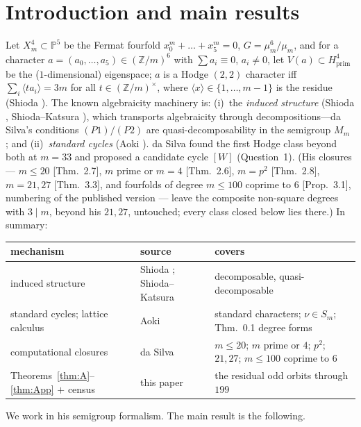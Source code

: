 \documentclass[11pt]{amsart}
\theoremstyle{remark}
\newcommand{\Z}{\mathbb{Z}}
\newcommand{\PP}{\mathbb{P}}
\newcommand{\fr}[1]{\langle #1\rangle}
\newcommand{\V}{V}
\begin{document}
\section{Introduction and main results}\label{sec:intro}
Let $X^4_m\subset\PP^5$ be the Fermat fourfold $x_0^m+\dots+x_5^m=0$, $G=\mu_m^6/\mu_m$, and for a
character $a=(a_0,\dots,a_5)\in(\Z/m)^6$ with $\sum a_i\equiv0$, $a_i\neq0$, let $\V(a)\subset
H^4_{\mathrm{prim}}$ be the ($1$-dimensional) eigenspace; $a$ is a Hodge $(2,2)$ character iff
$\sum_i\fr{ta_i}=3m$ for all $t\in(\Z/m)^\times$, where $\fr{x}\in\{1,\dots,m-1\}$ is the residue
(Shioda \cite{Shioda79}). The known algebraicity machinery is: (i)~the \emph{induced structure}
(Shioda \cite{Shioda79}, Shioda--Katsura \cite{SK}), which transports algebraicity through
decompositions---da Silva's conditions $(P1)/(P2)$ are quasi-decomposability in the semigroup $M_m$
\cite{daSilva}; and (ii)~\emph{standard cycles} (Aoki \cite{Aoki87}). da Silva \cite[Prop.~3.4 (= Prop.~3.6 of the arXiv version)]{daSilva}
found the first Hodge class beyond both at $m=33$ and proposed a candidate cycle $[W]$ (Question~1).
(His closures --- $m\le20$ [Thm.~2.7], $m$ prime or $m=4$ [Thm.~2.6], $m=p^2$ [Thm.~2.8],
$m=21,27$ [Thm.~3.3], and fourfolds of degree $m\le100$ coprime to $6$ [Prop.~3.1], numbering of
the published version \cite{daSilva} --- leave the composite non-square degrees with $3\mid m$, beyond
his $21,27$, untouched; every class closed below lies there.) In summary:
\begin{center}\footnotesize
\begin{tabular}{ll>{\raggedright\arraybackslash}p{4.9cm}}
\toprule
mechanism & source & covers\\
\midrule
induced structure & Shioda \cite{Shioda79}; Shioda--Katsura \cite{SK} & decomposable, quasi-decomposable\\
standard cycles; lattice calculus & Aoki \cite{Aoki87,Aoki00} & standard characters; $\nu\in S_m$; Thm.~0.1 degree forms\\
computational closures & da Silva \cite{daSilva} & $m\le20$; $m$ prime or $4$; $p^2$; $21,27$; $m\le100$ coprime to $6$\\
Theorems~\ref{thm:A}--\ref{thm:App} $+$ census & this paper & the residual odd orbits through $199$\\
\bottomrule
\end{tabular}
\end{center}
We work in his semigroup formalism. The main result is the following.
\end{document}
